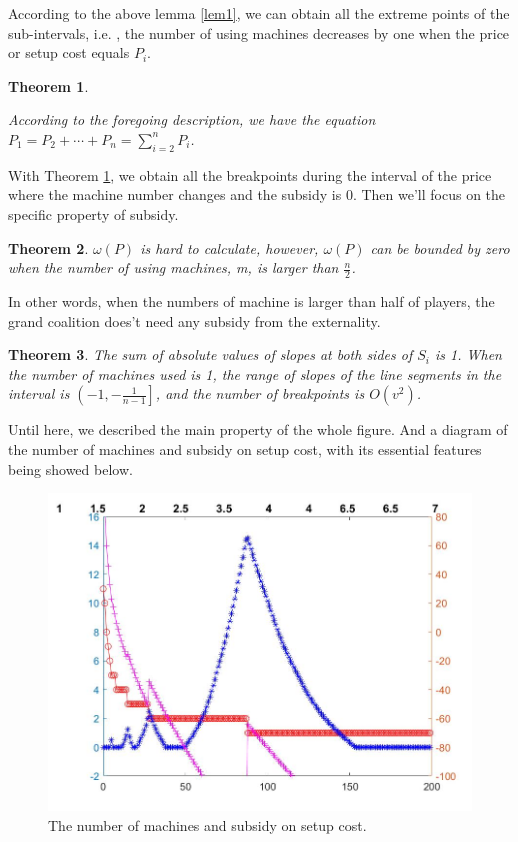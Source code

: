 \documentclass[UTF8]{article}
\newtheorem{thm}{\hspace{2em}Theorem}
\begin{document}
According to the above lemma \ref{lem1}, we can obtain all the extreme points of the sub-intervals, i.e. , the number of using machines decreases by one when the price or setup cost equals $P_i$.


\begin{thm}\label{thm2}

According to the foregoing description, we have the equation $P_{1}=P_{2}+\cdots+P_{n}=\sum_{i=2}^n P_i$.

\end{thm}

With Theorem \ref{thm2}, we obtain all the breakpoints during the interval of the price where the machine number changes and the subsidy is $0$. Then we'll focus on the specific property of subsidy.

\begin{thm}\label{thm3}
$\omega(P)$ is hard to calculate, however, $\omega(P)$ can be bounded by zero when the number of using machines, m, is larger than $\frac{n}{2}$.
\end{thm}

In other words, when the numbers of machine is larger than half of players, the grand coalition does't need any subsidy from the externality.

\begin{thm}\label{thm4}
The sum of absolute values of slopes at both sides of $S_i$ is 1.
When the number of machines used is 1, the range of slopes of the line segments in the interval is $\left( -1 , -\frac{1}{n-1} \right]$, and the number of breakpoints is $ O(v^2) $.
\end{thm}

Until here, we described the main property of the whole figure.
And a diagram of the number of machines and subsidy on setup cost, with its essential features being showed below.

\begin{figure}[h]%
	\centering  %
	\includegraphics[width=0.8\linewidth]{Figures/Image30}  %
	\caption{The number of machines and subsidy on setup cost.}  %
	\label{fig:Image11}   %
\end{figure}
\end{document}
